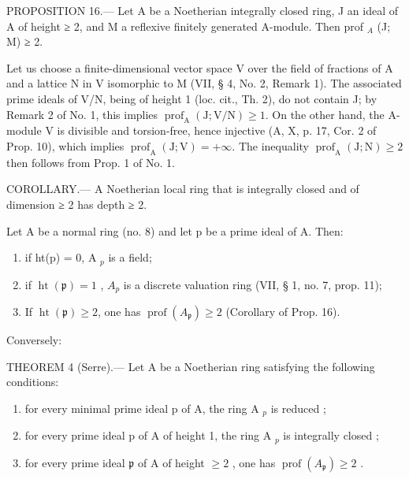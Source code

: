 PROPOSITION 16.--- Let A be a Noetherian integrally closed ring, J an ideal of A of height ≥ 2, and M a reflexive finitely generated A-module. Then prof \(_{A}\) (J; M) ≥ 2.

Let us choose a finite-dimensional vector space V over the field of fractions of A and a lattice N in V isomorphic to M (VII, § 4, No. 2, Remark 1). The associated prime ideals of V/N, being of height 1 (loc. cit., Th. 2), do not contain J; by Remark 2 of No. 1, this implies \(\operatorname{prof}_{\mathrm{A}}(\mathrm{J};\mathrm{V}/\mathrm{N}) \geqslant 1\). On the other hand, the A-module V is divisible and torsion-free, hence injective (A, X, p. 17, Cor. 2 of Prop. 10), which implies \(\operatorname{prof}_{\mathrm{A}}(\mathrm{J};\mathrm{V}) = +\infty\). The inequality \(\operatorname{prof}_{\mathrm{A}}(\mathrm{J};\mathrm{N}) \geqslant 2\) then follows from Prop. 1 of No. 1.

COROLLARY.--- A Noetherian local ring that is integrally closed and of dimension ≥ 2 has depth ≥ 2.

Let A be a normal ring (no. 8) and let p be a prime ideal of A. Then:

\begin{enumerate}
\def\labelenumi{\alph{enumi})}
\item
  if ht(p) = 0, A \(_{p}\) is a field;
\item
  if \(\operatorname{ht}(\mathfrak{p}) = 1\) , \(A_{p}\) is a discrete valuation ring (VII, § 1, no. 7, prop. 11);
\item
  If \(\operatorname{ht}(\mathfrak{p}) \geqslant 2\), one has \(\operatorname{prof}(A_{\mathfrak{p}}) \geqslant 2\) (Corollary of Prop. 16).
\end{enumerate}

Conversely:

THEOREM 4 (Serre).--- Let A be a Noetherian ring satisfying the following conditions:

\begin{enumerate}
\def\labelenumi{(\roman{enumi})}
\item
  for every minimal prime ideal p of A, the ring A \(_{p}\) is reduced ;
\item
  for every prime ideal p of A of height 1, the ring A \(_{p}\) is integrally closed ;
\item
  for every prime ideal \(\mathfrak{p}\) of A of height \(\geqslant 2\) , one has \(\operatorname{prof}(A_{\mathfrak{p}}) \geqslant 2\) .
\end{enumerate}

